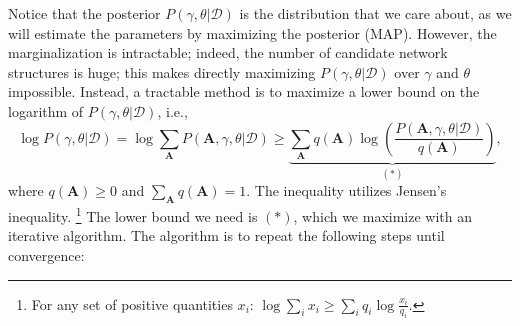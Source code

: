         Notice that the posterior $P(\gamma, \theta | \mathcal{D})$ is the distribution that we care about, as we will estimate the parameters by maximizing the posterior (MAP).
        However, the marginalization is intractable; indeed, the number of candidate network structures is huge; this makes directly maximizing $P(\gamma, \theta | \mathcal{D})$ over $\gamma$ and $\theta$ impossible.
        Instead, a tractable method is to maximize a lower bound on the logarithm of $P(\gamma, \theta | \mathcal{D})$, i.e., 
            \begin{equation}
                \log P(\gamma, \theta | \mathcal{D}) = \log \sum_{\bm{A}}^{}{P(\bm{A}, \gamma, \theta | \mathcal{D})} \ge 
                \underbrace{\sum_{\bm{A}}^{}{q(\bm{A}) \log \left( \frac{P(\bm{A}, \gamma, \theta | \mathcal{D})}{ q(\bm{A}) } \right) }}_{(\ast)},
            \end{equation}
        where $q(\bm{A}) \ge 0$ and $\sum_{\bm{A}}^{}{q(\bm{A})} = 1$.
        The inequality utilizes Jensen's inequality.
        \footnote{For any set of positive quantities $x_i$: $\log \sum_{i}^{}{x_i} \ge \sum_{i}^{}{q_i \log \frac{x_i}{q_i}}$.}
        The lower bound we need is $(\ast)$, which we maximize with an iterative algorithm.
        The algorithm is to repeat the following steps until convergence:
